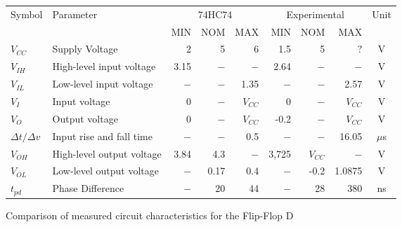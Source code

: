 \begin{tabular}{|l|l|r|r|r|r|r|r|c|}
    \toprule
    Symbol  &Parameter  &\multicolumn{3}{c|}{74HC74}&\multicolumn{3}{c|}{Experimental}&Unit\\
            &           &   MIN&NOM&MAX&MIN&NOM&MAX&\\
    \midrule
    $V_{CC}$&Supply Voltage&2&5&6&1.5&5&$?$&V\\
    $V_{IH}$&High-level input voltage&3.15&$-$&$-$&2.64&$-$&$-$&V\\
    $V_{IL}$&Low-level input voltage&$-$&$-$&1.35&$-$&$-$&2.57&V\\
    $V_{I}$ &Input voltage&0&$-$&$V_{CC}$&0&$-$&$V_{CC}$&V\\
    $V_{O}$ &Output voltage&0&$-$&$V_{CC}$&-0.2&$-$&$V_{CC}$&V\\
    $\Delta t / \Delta v$&  Input rise and fall time&$-$&$-$&0.5&$-$&$-$&16.05&$\mu$s\\
    \midrule
    $V_{OH}$&High-level output voltage&3.84&4.3&$-$&3,725&$V_{CC}$&$-$&V\\
    $V_{OL}$&Low-level output voltage &$-$&0.17&0.4&$-$&-0.2&1.0875&V\\
    \midrule
    $t_{pd}$&Phase Difference&$-$&20&44&$-$&28&380&ns\\  %
    \bottomrule
\end{tabular}
\caption{Comparison of measured circuit characteristics for the Flip-Flop D}